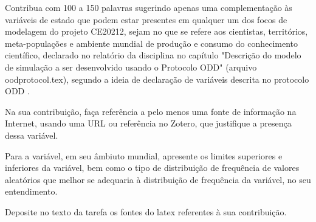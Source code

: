 Contribua com 100 a 150 palavras sugerindo apenas uma complementação às variáveis de estado que podem estar presentes em qualquer um dos focos de modelagem do projeto CE20212, sejam no que se refere aos cientistas, territórios, meta-populações e ambiente mundial de produção e consumo do conhecimento científico, declarado no relatório da disciplina no capítulo "Descrição do modelo de simulação a ser desenvolvido usando o Protocolo ODD" (arquivo oodprotocol.tex), segundo a ideia de declaração de variáveis descrita no protocolo ODD \citep{grimm_standard_2006}.

Na sua contribuição, faça referência a pelo menos uma fonte de informação na Internet, usando uma URL ou referência no Zotero, que justifique a presença dessa variável.

Para a variável, em seu âmbiuto mundial, apresente os limites superiores e inferiores da variável, bem como o tipo de distribuição de frequência de valores aleatórios que melhor se adequaria à distribuição de frequência da variável, no seu entendimento.

Deposite no texto da tarefa os fontes do latex referentes à sua contribuição.